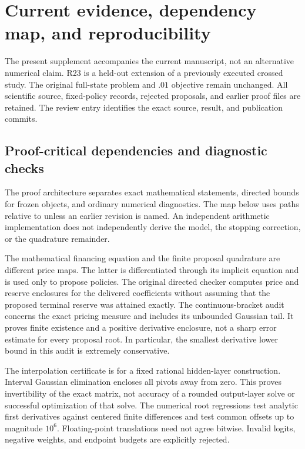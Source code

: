 \section{Current evidence, dependency map, and reproducibility}\label{sec:r23supp}
The present supplement accompanies the current manuscript, not an alternative numerical claim. R23 is a held-out extension of a previously executed crossed study. The original full-state problem and $.01$ objective remain unchanged. All scientific source, fixed-policy records, rejected proposals, and earlier proof files are retained. The review entry identifies the exact source, result, and publication commits.

\subsection{Proof-critical dependencies and diagnostic checks}
The proof architecture separates exact mathematical statements, directed bounds for frozen objects, and ordinary numerical diagnostics. The map below uses paths relative to  unless an earlier revision is named. An independent arithmetic implementation does not independently derive the model, the stopping correction, or the quadrature remainder.


The mathematical financing equation and the finite proposal quadrature are different price maps. The latter is differentiated through its implicit equation and is used only to propose policies. The original directed checker computes price and reserve enclosures for the delivered coefficients without assuming that the proposed terminal reserve was attained exactly. The continuous-bracket audit concerns the exact pricing measure and includes its unbounded Gaussian tail. It proves finite existence and a positive derivative enclosure, not a sharp error estimate for every proposal root. In particular, the smallest derivative lower bound in this audit is extremely conservative.

The interpolation certificate is for a fixed rational hidden-layer construction. Interval Gaussian elimination encloses all pivots away from zero. This proves invertibility of the exact matrix, not accuracy of a rounded output-layer solve or successful optimization of that solve. The numerical root regressions test analytic first derivatives against centered finite differences and test common offsets up to magnitude $10^6$. Floating-point translations need not agree bitwise. Invalid logits, negative weights, and endpoint budgets are explicitly rejected.

